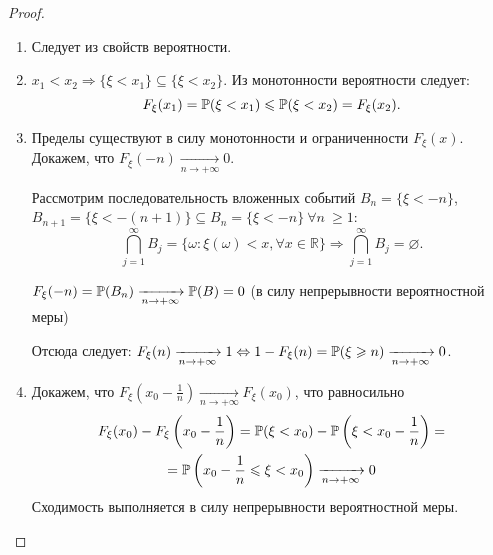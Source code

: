 \begin{proof}
\begin{enumerate}
    \item Следует из свойств вероятности.
    \item 
        $x_1 < x_2 \Rightarrow \{\xi < x_1 \} \subseteq \{\xi < x_2\}$. Из монотонности вероятности следует:
        \begin{equation*}
            F_\xi(x_1) = {\mathbb{P}(\xi < x_1)} \leqslant {\mathbb{P}(\xi < x_2)} = F_\xi(x_2).
        \end{equation*}
    \item 
        Пределы существуют в силу монотонности и ограниченности $F_\xi(x)$. Докажем, что $F_\xi(-n) \xrightarrow[n \to +\infty]{} 0$.
        
        Рассмотрим последовательность вложенных событий $B_n = \{\xi < -n \}$, $B_{n+1} = \{\xi < -(n+1) \} \subseteq B_n = \{\xi < -n \} ~ \forall n ~ \geqslant 1$:
        \begin{equation*}
            \bigcap\limits_{j = 1}^{\infty}B_j = \{\omega \colon \xi(\omega) < x, \forall x \in \mathbb{R} \} \Rightarrow \bigcap\limits_{j = 1}^{\infty}B_j = \varnothing.
        \end{equation*}
    
        $F_\xi(-n) = {\mathbb{P}(B_n)} \xrightarrow[n \to +\infty]{} {\mathbb{P}(B)} = 0$ (в силу непрерывности вероятностной меры)
    
        Отсюда следует: $F_\xi(n) \xrightarrow[n \to +\infty]{} 1 \Leftrightarrow 1 - F_\xi(n) = {\mathbb{P}(\xi \geqslant n)} \xrightarrow[n \to +\infty]{} 0$.
\iffalse    
        Аналогично, пусть $B_n = \{\xi \geqslant n\}, B_{n+1} = \{\xi \geqslant (n+1) \} \subseteq B_n, \ldots$:
        \begin{equation*}
            \bigcap\limits_{j = 1}^{\infty}B_j = \varnothing \Rightarrow \xi(w) > x \quad \forall x \in \mathbb{R}
        \end{equation*}
        Следовательно, 
        \begin{equation*}
            1 - F_\xi(n) = \myprob{B_n} \xrightarrow[n \to +\infty]{} \myprob{B} = 0 \Rightarrow F_\xi(n) \xrightarrow[n \to +\infty]{}1
        \end{equation*}
\fi
    \item
        Докажем, что $F_\xi(x_0 - \frac{1}{n}) \xrightarrow[n \to +\infty]{} F_\xi(x_0)$, что равносильно 
        \begin{multline*}
            F_\xi(x_0) - F_\xi \left(x_0 - \frac{1}{n} \right) 
            = {\mathbb{P}(\xi < x_0)} - \mathbb{P}\left( \xi < x_0 - \frac{1}{n} \right) = \\ 
            = \mathbb{P}\left( x_0 - \frac{1}{n} \leqslant \xi < x_0 \right) \xrightarrow[n \to +\infty]{} 0
                \end{multline*}
        Сходимость выполняется в силу непрерывности вероятностной меры.
\end{enumerate}
\end{proof}

